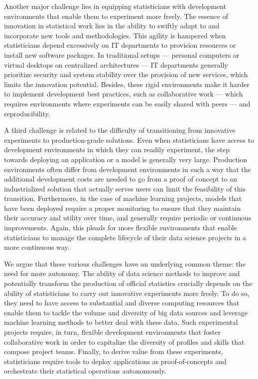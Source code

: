 \documentclass[graybox]{svmult}
\begin{document}
Another major challenge lies in equipping statisticians with development environments that enable them to experiment more freely. The essence of innovation in statistical work lies in the ability to swiftly adapt to and incorporate new tools and methodologies. This agility is hampered when statisticians depend excessively on IT departments to provision resources or install new software packages. In traditional setups — personal computers or virtual desktops on centralized architectures — IT departments generally prioritize security and system stability over the provision of new services, which limits the innovation potential. Besides, these rigid environments make it harder to implement development best practices, such as collaborative work — which requires environments where experiments can be easily shared with peers — and reproducibility.

A third challenge is related to the difficulty of transitioning from innovative experiments to production-grade solutions. Even when statisticians have access to development environments in which they can readily experiment, the step towards deploying an application or a model is generally very large. Production environments often differ from development environments in such a way that the additional development costs are needed to go from a proof of concept to an industrialized solution that actually serves users can limit the feasibility of this transition. Furthermore, in the case of machine learning projects, models that have been deployed require a proper monitoring to ensure that they maintain their accuracy and utility over time, and generally require periodic or continuous improvements. Again, this pleads for more flexible environments that enable statisticians to manage the complete lifecycle of their data science projects in a more continuous way.

We argue that these various challenges have an underlying common theme: the need for more autonomy. The ability of data science methods to improve and potentially transform the production of official statistics crucially depends on the ability of statisticians to carry out innovative experiments more freely. To do so, they need to have access to substantial and diverse computing resources that enable them to tackle the volume and diversity of big data sources and leverage machine learning methods to better deal with these data. Such experimental projects require, in turn, flexible development environments that foster collaborative work in order to capitalize the diversity of profiles and skills that compose project teams. Finally, to derive value from these experiments, statisticians require tools to deploy applications as proof-of-concepts and orchestrate their statistical operations autonomously.
\end{document}

